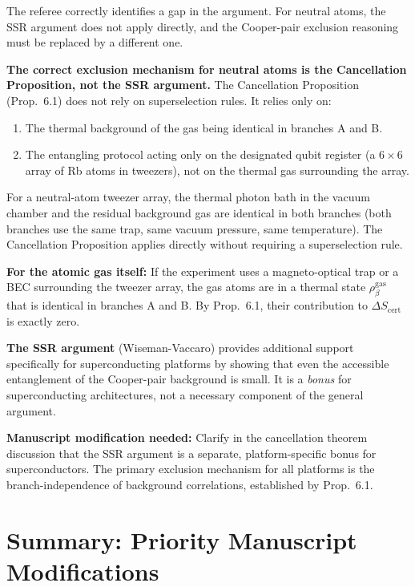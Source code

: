 \documentclass[11pt,letterpaper]{article}
\newcommand{\Scert}{S_{\mathrm{cert}}}
\begin{document}
\begin{tcolorbox}[breakable,enhanced,colback=green!3,colframe=green!55!black,
  fonttitle=\bfseries,title={Response},boxrule=0.8pt]
The referee correctly identifies a gap in the argument.  For neutral atoms, the SSR
argument does not apply directly, and the Cooper-pair exclusion reasoning must be replaced
by a different one.

\textbf{The correct exclusion mechanism for neutral atoms is the Cancellation Proposition,
not the SSR argument.}  The Cancellation Proposition (Prop.~6.1) does not rely on
superselection rules.  It relies only on:
\begin{enumerate}[noitemsep]
\item The thermal background of the gas being identical in branches A and B.
\item The entangling protocol acting only on the designated qubit register (a $6\times6$
  array of Rb atoms in tweezers), not on the thermal gas surrounding the array.
\end{enumerate}
For a neutral-atom tweezer array, the thermal photon bath in the vacuum chamber and the
residual background gas are identical in both branches (both branches use the same trap,
same vacuum pressure, same temperature).  The Cancellation Proposition applies directly
without requiring a superselection rule.

\textbf{For the atomic gas itself:}  If the experiment uses a magneto-optical trap or
a BEC surrounding the tweezer array, the gas atoms are in a thermal state $\rho_\beta^{\mathrm{gas}}$
that is identical in branches A and B.  By Prop.~6.1, their contribution to
$\Delta\Scert$ is exactly zero.

\textbf{The SSR argument} (Wiseman-Vaccaro) provides additional support specifically for
superconducting platforms by showing that even the accessible entanglement of the Cooper-pair
background is small.  It is a \emph{bonus} for superconducting architectures, not a necessary
component of the general argument.

\textbf{Manuscript modification needed:} Clarify in the cancellation theorem discussion
that the SSR argument is a separate, platform-specific bonus for superconductors.  The
primary exclusion mechanism for all platforms is the branch-independence of background
correlations, established by Prop.~6.1.
\end{tcolorbox}

\section*{Summary: Priority Manuscript Modifications}
\end{document}
